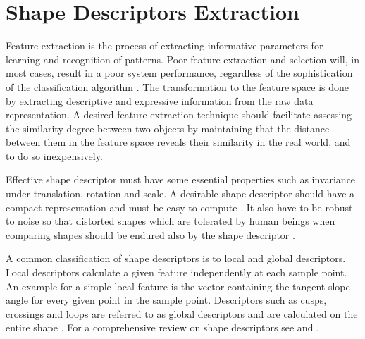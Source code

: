 \section{Shape Descriptors Extraction}
\label{sec:feature_extraction}
\iftoggle{edit-mode}{\hspace{0pt}\marginpar{Feature extraction}}{}
Feature extraction is the process of extracting informative parameters for learning and recognition of patterns. 
Poor feature extraction and selection will, in most cases, result in a poor system performance, regardless of the sophistication of the classification algorithm \cite{parizeau2001character}.
The transformation to the feature space is done by extracting descriptive and expressive information from the raw data representation. 
A desired feature extraction technique should facilitate assessing the similarity degree between two objects by maintaining that the distance between them in the feature space reveals their similarity in the real world, and to do so inexpensively.


\iftoggle{edit-mode}{\hspace{0pt}\marginpar{Shape Descriptors}}{}
Effective shape descriptor must have some essential properties such as invariance under translation, rotation and scale. 
A desirable shape descriptor should have a compact representation and must be easy to compute \cite{zhang2004review}.
It also have to be robust to noise so that distorted shapes which are tolerated by human beings when comparing shapes should be endured also by the shape descriptor \cite{zhang2004review, kim2000region}.

\iftoggle{edit-mode}{\hspace{0pt}\marginpar{Shape descriptors types}}{}
A common classification of shape descriptors is to local and global descriptors. 
Local descriptors calculate a given feature independently at each sample point. 
An example for a simple local feature is the vector containing the tangent slope angle for every given point in the sample point. 
Descriptors such as cusps, crossings and loops are referred to as global descriptors and are calculated on the entire shape \cite{hu1997combining}. 
For a comprehensive review on shape descriptors see \cite{zhang2004review} and \cite{yang2008survey}.

